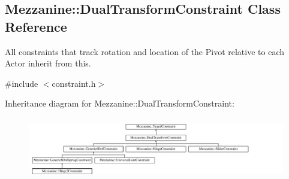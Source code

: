 \hypertarget{classMezzanine_1_1DualTransformConstraint}{
\subsection{Mezzanine::DualTransformConstraint Class Reference}
\label{classMezzanine_1_1DualTransformConstraint}
}


All constraints that track rotation and location of the Pivot relative to each Actor inherit from this.  




{\ttfamily \#include $<$constraint.h$>$}

Inheritance diagram for Mezzanine::DualTransformConstraint:\begin{figure}[H]
\begin{center}
\leavevmode
\includegraphics[height=2.766798cm]{classMezzanine_1_1DualTransformConstraint}
\end{center}
\end{figure}
